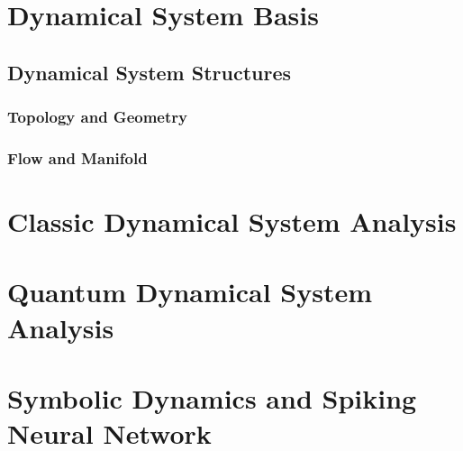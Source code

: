 
\chapter{Dynamical System Basis}
\section{Dynamical System Structures}
\subsection{Topology and Geometry}
\subsection{Flow and Manifold}


\chapter{Classic Dynamical System Analysis}

\chapter{Quantum Dynamical System Analysis}

\chapter{Symbolic Dynamics and Spiking Neural Network}


